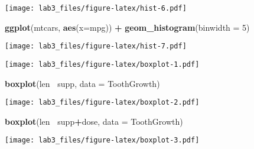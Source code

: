\documentclass[
]{article}
\newenvironment{Shaded}{\begin{snugshade}}{\end{snugshade}}
\newcommand{\CommentTok}[1]{\textcolor[rgb]{0.56,0.35,0.01}{\textit{#1}}}
\newcommand{\DataTypeTok}[1]{\textcolor[rgb]{0.13,0.29,0.53}{#1}}
\newcommand{\DecValTok}[1]{\textcolor[rgb]{0.00,0.00,0.81}{#1}}
\newcommand{\KeywordTok}[1]{\textcolor[rgb]{0.13,0.29,0.53}{\textbf{#1}}}
\newcommand{\NormalTok}[1]{#1}
\newcommand{\OperatorTok}[1]{\textcolor[rgb]{0.81,0.36,0.00}{\textbf{#1}}}
\newcommand{\StringTok}[1]{\textcolor[rgb]{0.31,0.60,0.02}{#1}}
\begin{document}
\texttt{[image: lab3\_files/figure-latex/hist-6.pdf]}

\begin{Shaded}
\begin{Highlighting}[]
\KeywordTok{ggplot}\NormalTok{(mtcars, }\KeywordTok{aes}\NormalTok{(}\DataTypeTok{x=}\NormalTok{mpg)) }\OperatorTok{+}\StringTok{ }\KeywordTok{geom_histogram}\NormalTok{(}\DataTypeTok{binwidth =} \DecValTok{5}\NormalTok{)}
\end{Highlighting}
\end{Shaded}

\texttt{[image: lab3\_files/figure-latex/hist-7.pdf]}

\begin{Shaded}
\end{Shaded}

\texttt{[image: lab3\_files/figure-latex/boxplot-1.pdf]}

\begin{Shaded}
\begin{Highlighting}[]
\KeywordTok{boxplot}\NormalTok{(len }\OperatorTok{~}\NormalTok{supp, }\DataTypeTok{data =}\NormalTok{ ToothGrowth)}
\end{Highlighting}
\end{Shaded}

\texttt{[image: lab3\_files/figure-latex/boxplot-2.pdf]}

\begin{Shaded}
\begin{Highlighting}[]
\KeywordTok{boxplot}\NormalTok{(len}\OperatorTok{~}\StringTok{ }\NormalTok{supp}\OperatorTok{+}\NormalTok{dose, }\DataTypeTok{data =}\NormalTok{ ToothGrowth)}
\end{Highlighting}
\end{Shaded}

\texttt{[image: lab3\_files/figure-latex/boxplot-3.pdf]}

\begin{Shaded}
\end{Shaded}
\end{document}

